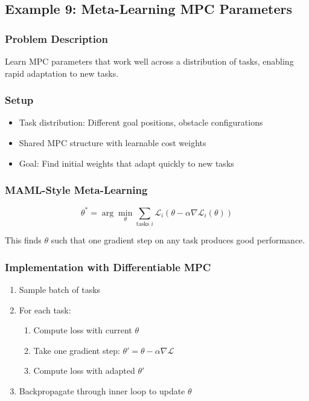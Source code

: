 \subsection{Example 9: Meta-Learning MPC Parameters}

\subsubsection{Problem Description}

Learn MPC parameters that work well across a distribution of tasks, enabling rapid adaptation to new tasks.

\subsubsection{Setup}

\begin{itemize}
    \item Task distribution: Different goal positions, obstacle configurations
    \item Shared MPC structure with learnable cost weights
    \item Goal: Find initial weights that adapt quickly to new tasks
\end{itemize}

\subsubsection{MAML-Style Meta-Learning}

\begin{equation}
\theta^* = \arg\min_\theta \sum_{\text{tasks } i} \mathcal{L}_i(\theta - \alpha \nabla \mathcal{L}_i(\theta))
\end{equation}

This finds $\theta$ such that one gradient step on any task produces good performance.

\subsubsection{Implementation with Differentiable MPC}

\begin{enumerate}
    \item Sample batch of tasks
    \item For each task:
    \begin{enumerate}
        \item Compute loss with current $\theta$
        \item Take one gradient step: $\theta' = \theta - \alpha \nabla \mathcal{L}$
        \item Compute loss with adapted $\theta'$
    \end{enumerate}
    \item Backpropagate through inner loop to update $\theta$
\end{enumerate}

